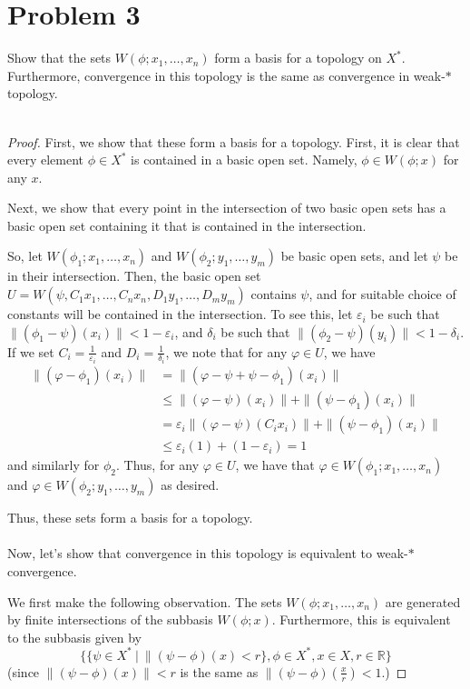 \documentclass[fontsize=11pt]{scrartcl} %
\numberwithin{equation}{section} %
\numberwithin{figure}{section} %
\numberwithin{table}{section} %
\newcommand{\R}{\mathbb{R}}
\begin{document}
\newpage

\section*{Problem 3}
Show that the sets $W(\phi;x_1,\dots,x_n)$ form a basis for a topology on $X^*$.
Furthermore, convergence in this topology is the same as convergence in weak-$*$
topology.
\\
\\
\begin{proof}
    First, we show that these form a basis for a topology. First, it is clear
    that every element $\phi\in X^*$ is contained in a basic open set. Namely,
    $\phi\in W(\phi;x)$ for any $x$.

    Next, we show that every point in the intersection of two basic open sets
    has a basic open set containing it that is contained in the intersection.

    So, let $W(\phi_1;x_1,\dots,x_n)$ and $W(\phi_2;y_1,\dots,y_m)$ be basic
    open sets, and let $\psi$ be in their intersection. Then, the basic open set
    $U = W(\psi, C_1x_1,\dots,C_nx_n,D_1y_1,\dots,D_my_m)$ contains $\psi$, and for
    suitable choice of constants will be contained in the intersection. To see
    this, let $\varepsilon_i$ be such that
    $\|(\phi_1-\psi)(x_i)\|<1-\varepsilon_i$, and $\delta_i$ be such that
    $\|(\phi_2-\psi)(y_i)\|<1-\delta_i$. If we set $C_i =
    \frac{1}{\varepsilon_i}$ and $D_i = \frac{1}{\delta_i}$, we note that for
    any $\varphi\in U$, we have
    \[
\begin{aligned}
    \|(\varphi -\phi_1)(x_i)\| &= \|(\varphi - \psi + \psi - \phi_1)(x_i)\|\\
    &\leq \|(\varphi - \psi)(x_i)\| + \|(\psi - \phi_1)(x_i)\|\\
    &= \varepsilon_i\|(\varphi-\psi)(C_ix_i)\| + \|(\psi - \phi_1)(x_i)\|\\
    &\leq \varepsilon_i(1) + (1-\varepsilon_i) = 1
\end{aligned}
    \]
    and similarly for $\phi_2$. Thus, for any $\varphi\in U$, we have that
    $\varphi\in W(\phi_1;x_1,\dots,x_n)$ and $\varphi\in
    W(\phi_2;y_1,\dots,y_m)$ as desired.

    Thus, these sets form a basis for a topology.
    \\
    \\
    Now, let's show that convergence in this topology is equivalent to weak-$*$
    convergence.

    We first make the following observation. The sets $W(\phi;x_1,\dots,x_n)$
    are generated by finite intersections of the subbasis $W(\phi;x)$.
    Furthermore, this is equivalent to the subbasis given by
    \[
        \{\{\psi\in X^*\ |\ \|(\psi - \phi)(x) < r\}, \phi\in X^*,x\in X, r\in
        \R\}
    \]
    (since $\|(\psi-\phi)(x)\| < r$ is the same as
    $\|(\psi-\phi)(\frac{x}{r})<1$.)


\end{proof}
\end{document}
